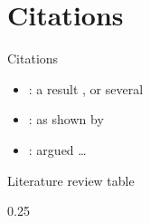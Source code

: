 \section{Citations}

\begin{frame}{Citations}
  \begin{itemize}
    \item {}: a result \cite{placeholder_article}, or several
          \cite{placeholder_conference,placeholder_book}
    \item {}: as shown by \textcite{placeholder_article}
    \item {}: \citeauthor{placeholder_book} argued \ldots
  \end{itemize}
\end{frame}

\begin{frame}{Literature review table}
  \begin{litreview}{0.25\textwidth}
  \end{litreview}
\end{frame}
